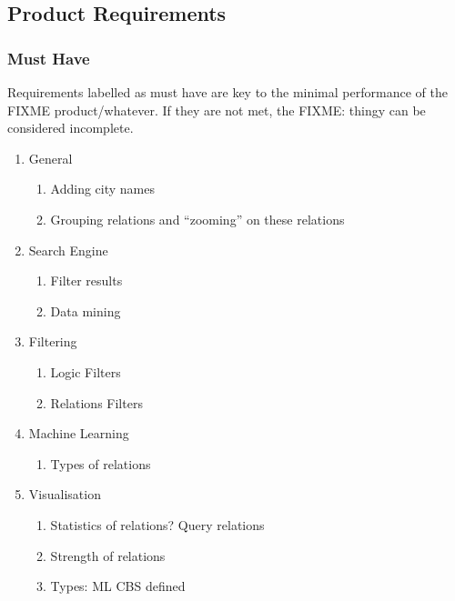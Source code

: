 \subsection{Product Requirements}\label{sec:reqs}
\subsubsection {Must Have}
Requirements labelled as must have are key to the minimal performance of the {\color{red} FIXME product/whatever}. If they are not met, the {\color{red} FIXME: thingy} can be considered incomplete.

\begin{enumerate}
    \item{General} 
    \begin{enumerate}
        \item Adding city names
        \item Grouping relations and “zooming” on these relations
    \end{enumerate}
    
    \item{Search Engine} 
    \begin{enumerate}
        \item Filter results
        \item Data mining
    \end{enumerate}
    
    \item{Filtering} 
    \begin{enumerate}
        \item Logic Filters 
        \item Relations Filters
    \end{enumerate}
    
    \item{Machine Learning} 
    \begin{enumerate}
        \item Types of relations
    \end{enumerate}
    
    \item{Visualisation}
    \begin{enumerate}
        \item Statistics of relations? Query relations
        \item Strength of relations
        \item Types: ML CBS defined
    \end{enumerate}
\end{enumerate}


